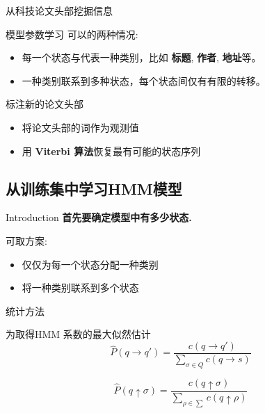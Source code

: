 \documentclass{beamer}
\begin{document}
\begin{frame}{ 从科技论文头部挖掘信息}
    \begin{block}{模型参数学习}
        可以的两种情况:
        \begin{itemize}
            \item 每一个状态与代表一种类别，比如 \textbf{标题}, \textbf{作者}, \textbf{地址}等。
            \item 一种类别联系到多种状态，每个状态间仅有有限的转移。
        \end{itemize}
    \end{block}
    
    \begin{block}{ 标注新的论文头部}
        \begin{itemize}
            \item 将论文头部的词作为观测值
            \item 用 \textbf{Viterbi 算法}恢复最有可能的状态序列
        \end{itemize}
    \end{block}
\end{frame}

\subsection{从训练集中学习HMM模型}
\begin{frame}{Introduction}
    \textbf{首先要确定模型中有多少状态.}
    \begin{block}{可取方案:}
        \begin{itemize}
            \item 仅仅为每一个状态分配一种类别
            \item 将一种类别联系到多个状态
        \end{itemize}
    \end{block}
\end{frame}

\begin{frame}{统计方法}
    \begin{block}{ 为取得HMM 系数的最大似然估计}
    \begin{equation}
        \hat{P}(q \rightarrow q') = 
        \frac{c(q \rightarrow q')}
        {\sum_{\sigma \in Q}{c(q \rightarrow s)}}
    \end{equation}

    \begin{equation}
        \hat{P}(q \uparrow \sigma) = 
        \frac{c(q\uparrow \sigma)}
        {\sum_{\rho \in \sum}{c(q \uparrow \rho)}}
    \end{equation}
    \end{block}
\end{frame}
\end{document}

